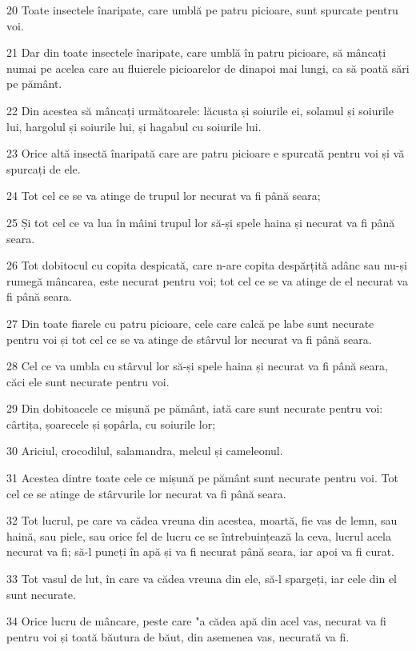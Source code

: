 \par 20 Toate insectele înaripate, care umblă pe patru picioare, sunt spurcate pentru voi.
\par 21 Dar din toate insectele înaripate, care umblă în patru picioare, să mâncați numai pe acelea care au fluierele picioarelor de dinapoi mai lungi, ca să poată sări pe pământ.
\par 22 Din acestea să mâncați următoarele: lăcusta și soiurile ei, solamul și soiurile lui, hargolul și soiurile lui, și hagabul cu soiurile lui.
\par 23 Orice altă insectă înaripată care are patru picioare e spurcată pentru voi și vă spurcați de ele.
\par 24 Tot cel ce se va atinge de trupul lor necurat va fi până seara;
\par 25 Și tot cel ce va lua în mâini trupul lor să-și spele haina și necurat va fi până seara.
\par 26 Tot dobitocul cu copita despicată, care n-are copita despărțită adânc sau nu-și rumegă mâncarea, este necurat pentru voi; tot cel ce se va atinge de el necurat va fi până seara.
\par 27 Din toate fiarele cu patru picioare, cele care calcă pe labe sunt necurate pentru voi și tot cel ce se va atinge de stârvul lor necurat va fi până seara.
\par 28 Cel ce va umbla cu stârvul lor să-și spele haina și necurat va fi până seara, căci ele sunt necurate pentru voi.
\par 29 Din dobitoacele ce mișună pe pământ, iată care sunt necurate pentru voi: cârtița, șoarecele și șopârla, cu soiurile lor;
\par 30 Ariciul, crocodilul, salamandra, melcul și cameleonul.
\par 31 Acestea dintre toate cele ce mișună pe pământ sunt necurate pentru voi. Tot cel ce se atinge de stârvurile lor necurat va fi până seara.
\par 32 Tot lucrul, pe care va cădea vreuna din acestea, moartă, fie vas de lemn, sau haină, sau piele, sau orice fel de lucru ce se întrebuințează la ceva, lucrul acela necurat va fi; să-l puneți în apă și va fi necurat până seara, iar apoi va fi curat.
\par 33 Tot vasul de lut, în care va cădea vreuna din ele, să-l spargeți, iar cele din el sunt necurate.
\par 34 Orice lucru de mâncare, peste care "a cădea apă din acel vas, necurat va fi pentru voi și toată băutura de băut, din asemenea vas, necurată va fi.
